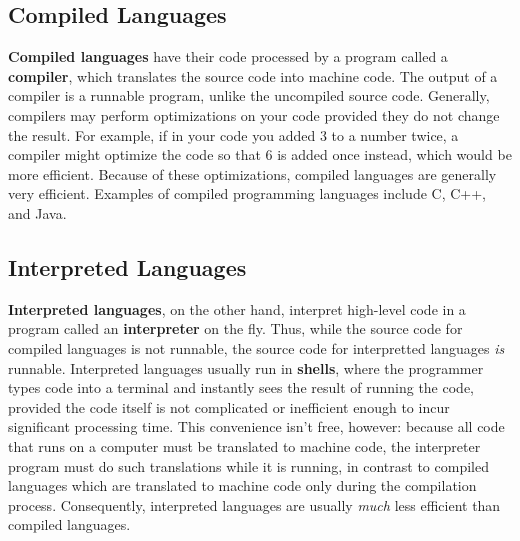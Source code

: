 \documentclass{article}
\begin{document}
\subsection*{Compiled Languages}
\textbf{Compiled languages} have their code processed by a program called a \textbf{compiler}, which translates the source code into
machine code. The output of a compiler is a runnable program, unlike the uncompiled source code. Generally, compilers 
may perform optimizations on your code provided they do not change the result. For example, if in your code you added 3 
to a number twice, a compiler might optimize the code so that 6 is added once instead, which would be more 
efficient. Because of these optimizations, compiled languages are generally very efficient. Examples of compiled 
programming languages include C, C++, and Java.
\subsection*{Interpreted Languages}
\textbf{Interpreted languages}, on the other hand, interpret high-level code in a program called an \textbf{interpreter}
on the fly. Thus, while the source code for compiled languages is not runnable, the source code for interpretted
languages \textit{is} runnable. Interpreted languages usually run in \textbf{shells}, where the programmer types code 
into a terminal and instantly sees the result of running the code, provided the code itself is not complicated or 
inefficient enough to incur significant processing time. This convenience isn't free, however: because all code that 
runs on a computer must be translated to machine code, the interpreter program must do such translations while it is
running, in contrast to compiled languages which are translated to machine code only during the compilation process.
Consequently, interpreted languages are usually \textit{much} less efficient than compiled languages.
\end{document}
